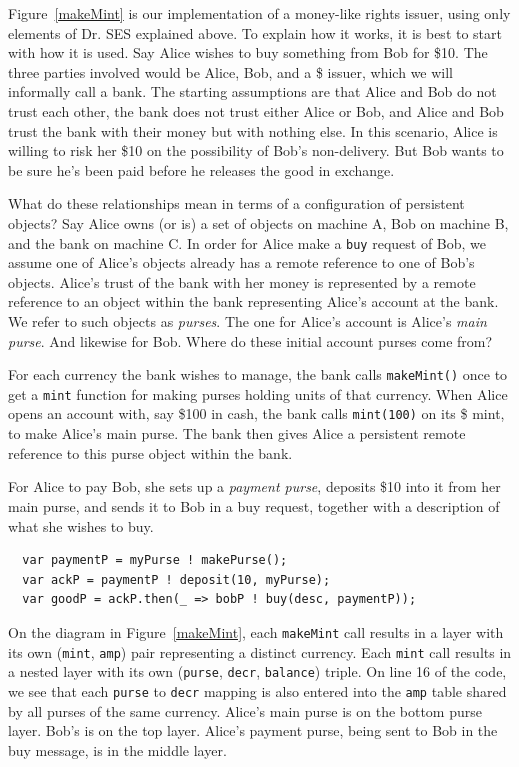 \documentclass{llncs}
\begin{document}
Figure~\ref{makeMint}  is our implementation of a money-like rights issuer, using only elements of Dr. SES explained above. To explain how it works, it is best to start with how it is used. Say Alice wishes to buy something from Bob for \$10. The three parties involved would be Alice, Bob, and a \$ issuer, which we will informally call a bank. The starting assumptions are that Alice and Bob do not trust each other, the bank does not trust either Alice or Bob, and Alice and Bob trust the bank with their money but with nothing else. In this scenario, Alice is willing to risk her \$10 on the possibility of Bob's non-delivery. But Bob wants to be sure he's been paid before he releases the good in exchange.

What do these relationships mean in terms of a configuration of persistent objects? Say Alice owns (or is) a set of objects on machine A, Bob on machine B, and the bank on machine C. In order for Alice make a {\tt buy} request of Bob, we assume one of Alice's objects already has a remote reference to one of Bob's objects. Alice's trust of the bank with her money is represented by a remote reference to an object within the bank representing Alice's account at the bank. We refer to such objects as \emph{purses}. The one for Alice's account is Alice's \emph{main purse}. And likewise for Bob. Where do these initial account purses come from?

For each currency the bank wishes to manage, the bank calls {\tt makeMint()} once to get a {\tt mint} function for making purses holding units of that currency. When Alice opens an account with, say \$100 in cash, the bank calls {\tt mint(100)} on its \$ mint, to make Alice's main purse. The bank then gives Alice a persistent remote reference to this purse object within the bank.

For Alice to pay Bob, she sets up a \emph{payment purse}, deposits \$10 into it from her main purse, and sends it to Bob in a buy request, together with a description of what she wishes to buy.
\begin{verbatim}
  var paymentP = myPurse ! makePurse();
  var ackP = paymentP ! deposit(10, myPurse);
  var goodP = ackP.then(_ => bobP ! buy(desc, paymentP));
\end{verbatim}

On the diagram in Figure~\ref{makeMint}, each {\tt makeMint} call results in a layer with its own ({\tt mint}, {\tt amp}) pair representing a distinct currency. Each {\tt mint} call results in a nested layer with its own ({\tt purse}, {\tt decr}, {\tt balance}) triple. On line 16 of the code, we see that each {\tt purse} to {\tt decr} mapping is also entered into the {\tt amp} table shared by all purses of the same currency. Alice's main purse is on the bottom purse layer. Bob's is on the top layer. Alice's payment purse, being sent to Bob in the buy message, is in the middle layer.
\end{document}
